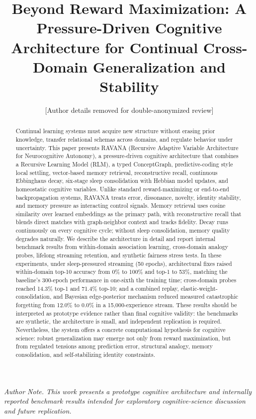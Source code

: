 \documentclass[11pt]{article}
\title{Beyond Reward Maximization: A Pressure-Driven Cognitive Architecture for Continual Cross-Domain Generalization and Stability}
\author{[Author details removed for double-anonymized review]}
\date{}
\begin{document}
\maketitle

\begin{center}
\textit{Author Note. This work presents a prototype cognitive architecture and internally reported benchmark results intended for exploratory cognitive-science discussion and future replication.}
\end{center}

\begin{abstract}
Continual learning systems must acquire new structure without erasing prior knowledge, transfer relational schemas across domains, and regulate behavior under uncertainty. This paper presents RAVANA (Recursive Adaptive Variable Architecture for Neurocognitive Autonomy), a pressure-driven cognitive architecture that combines a Recursive Learning Model (RLM), a typed ConceptGraph, predictive-coding style local settling, vector-based memory retrieval, reconstructive recall, continuous Ebbinghaus decay, six-stage sleep consolidation with Hebbian model updates, and homeostatic cognitive variables. Unlike standard reward-maximizing or end-to-end backpropagation systems, RAVANA treats error, dissonance, novelty, identity stability, and memory pressure as interacting control signals. Memory retrieval uses cosine similarity over learned embeddings as the primary path, with reconstructive recall that blends direct matches with graph-neighbor context and tracks fidelity. Decay runs continuously on every cognitive cycle; without sleep consolidation, memory quality degrades naturally. We describe the architecture in detail and report internal benchmark results from within-domain association learning, cross-domain analogy probes, lifelong streaming retention, and synthetic fairness stress tests. In these experiments, under sleep-pressured streaming (50 epochs), architectural fixes raised within-domain top-10 accuracy from 0\% to 100\% and top-1 to 53\%, matching the baseline's 300-epoch performance in one-sixth the training time; cross-domain probes reached 14.3\% top-1 and 71.4\% top-10; and a combined replay, elastic-weight-consolidation, and Bayesian edge-posterior mechanism reduced measured catastrophic forgetting from 12.0\% to 0.0\% in a 15,000-experience stream. These results should be interpreted as prototype evidence rather than final cognitive validity: the benchmarks are synthetic, the architecture is small, and independent replication is required. Nevertheless, the system offers a concrete computational hypothesis for cognitive science: robust generalization may emerge not only from reward maximization, but from regulated tensions among prediction error, structural analogy, memory consolidation, and self-stabilizing identity constraints.
\end{abstract}
\end{document}
